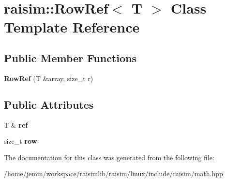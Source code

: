 \hypertarget{classraisim_1_1RowRef}{}\section{raisim\+:\+:Row\+Ref$<$ T $>$ Class Template Reference}
\label{classraisim_1_1RowRef}
\subsection*{Public Member Functions}
\begin{DoxyCompactItemize}
\item 
\mbox{\label{classraisim_1_1RowRef_ad62266b1bb4deb71ad52cebc041e2a6c}} 
{\bfseries Row\+Ref} (T \&array, size\+\_\+t r)
\end{DoxyCompactItemize}
\subsection*{Public Attributes}
\begin{DoxyCompactItemize}
\item 
\mbox{\label{classraisim_1_1RowRef_a7f3c2703b3c7486544bf190cfd5044bc}} 
T \& {\bfseries ref}
\item 
\mbox{\label{classraisim_1_1RowRef_ad15de86023c25c784fc88bfe5cf537b3}} 
size\+\_\+t {\bfseries row}
\end{DoxyCompactItemize}


The documentation for this class was generated from the following file\+:\begin{DoxyCompactItemize}
\item 
/home/jemin/workspace/raisimlib/raisim/linux/include/raisim/math.\+hpp\end{DoxyCompactItemize}
